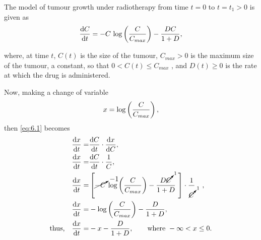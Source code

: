 \def\Cmax{C_{max}}%
The model of tumour growth under radiotherapy from time $t=0$ to $t=t_1>0$ is given as
\begin{equation}
	\label{eq:6.1}
	\deriv{C}{t} = -C\,\log\lr{\frac{C}{\Cmax}} - \frac{DC}{1+D},
\end{equation}

where, at time $t$, $C(t)$ is the size of the tumour, $\Cmax > 0$ is the maximum
size of the tumour, a constant, so that $0 < C(t) \leq \Cmax$ , and $D(t) \geq 0$ is the
rate at which the drug is administered.

Now, making a change of variable
\[
	x = \log\lr{\frac{C}{\Cmax}},
\]
then \eqref{eq:6.1} becomes
\begin{align*}
	\deriv{x}{t} =& \deriv{C}{t}\cdot\deriv{x}{C},\\
	\deriv{x}{t} =& \deriv{C}{t}\cdot \frac{1}{C},\\
	\deriv{x}{t} =& \lrs{\cancelto{-1}{-C}\,\log\lr{\frac{C}{\Cmax}} - \frac{D\cancelto{1}{C}}{1+D}\,\,} \cdot\frac{1}{\cancelto{1}{C}}\quad,\\
	\deriv{x}{t} =& -\log\lr{\frac{C}{\Cmax}} - \frac{D}{1+D},\\
	\textrm{thus,}\quad\deriv{x}{t} =& -x -\frac{D}{1+D}, \qquad\textrm{where } -\infty < x \leq 0.
\end{align*}